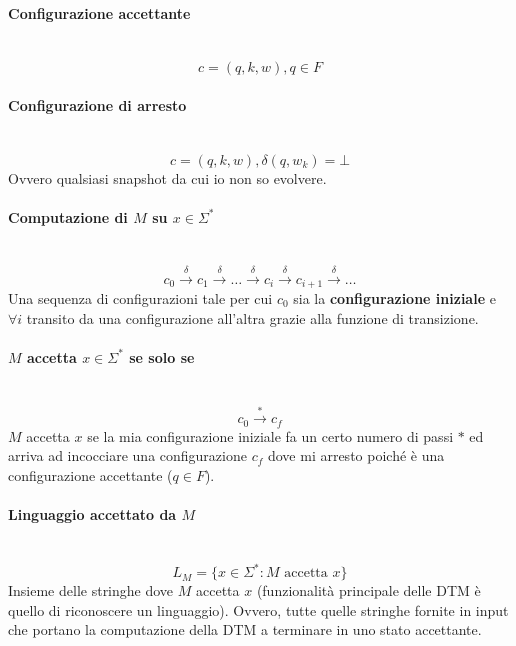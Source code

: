 \documentclass{article}
\begin{document}
\paragraph{Configurazione accettante}\mbox{}\\
$$c=(q,k,w),q\in F$$

\paragraph{Configurazione di arresto}\mbox{}\\
$$c=(q,k,w),\delta(q,w_k)=\bot$$
Ovvero qualsiasi snapshot da cui io non so evolvere.
\paragraph{Computazione di $M$ su $x\in\Sigma^*$}\mbox{}\\
$$c_0\overset{\delta}{\rightarrow}c_1\overset{\delta}{\rightarrow}\dots\overset{\delta}{\rightarrow}
    c_i\overset{\delta}{\rightarrow}c_{i+1}\overset{\delta}{\rightarrow}\dots$$
Una sequenza di configurazioni tale per cui $c_0$ sia la \textbf{configurazione iniziale} e $\forall i$
transito da una configurazione all'altra grazie alla funzione di transizione.

\paragraph{$M$ accetta $x\in\Sigma^*$ se solo se}\mbox{}\\
$$c_0\overset{*}{\rightarrow}c_f$$
$M$ accetta $x$ se la mia configurazione iniziale fa un certo numero di passi $*$ ed
arriva ad incocciare una configurazione $c_f$ dove mi arresto poiché è una configurazione accettante
($q\in F$).

\paragraph{Linguaggio accettato da $M$}\mbox{}\\
$$L_M=\{x\in\Sigma^*:M\text{ accetta }x\}$$
Insieme delle stringhe dove $M$ accetta $x$ (funzionalità principale delle DTM è quello
di riconoscere un linguaggio). Ovvero, tutte quelle stringhe fornite in input che portano
la computazione della DTM a terminare in uno stato accettante.
\end{document}

